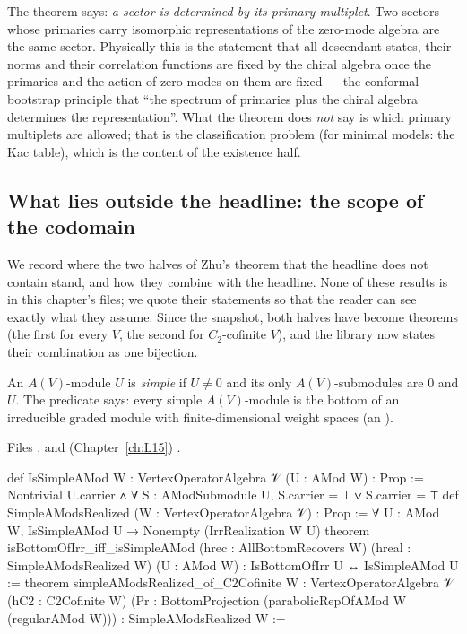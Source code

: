 \begin{physics}
The theorem says: \emph{a sector is determined by its primary multiplet}. Two sectors whose primaries carry isomorphic
representations of the zero-mode algebra are the same sector. Physically this is the statement that all descendant
states, their norms and their correlation functions are fixed by the chiral algebra once the primaries and the
action of zero modes on them are fixed --- the conformal bootstrap principle that ``the spectrum of primaries plus the
chiral algebra determines the representation''. What the theorem does \emph{not} say is which primary multiplets are
allowed; that is the classification problem (for minimal models: the Kac table), which is the content of the existence
half.
\end{physics}

\subsection{What lies outside the headline: the scope of the codomain}\label{l13:sec:scope}

We record where the two halves of Zhu's theorem that the headline does not contain stand, and how they combine with
the headline. None of these results is in this chapter's files; we quote their statements so that the reader can see
exactly what they assume. Since the snapshot, both halves have become theorems (the first for every $V$, the second for
$C_2$-cofinite $V$), and the library now states their combination as one bijection.

\begin{definition}\label{l13:def:simpleamod}
An $A(V)$-module $U$ is \emph{simple} if $U\neq0$ and its only $A(V)$-submodules are $0$ and $U$. The predicate
 says: every simple $A(V)$-module is the bottom of an irreducible graded module with
finite-dimensional weight spaces (an ).
\end{definition}
\noindent Files ,
 and (Chapter~\ref{ch:L15})
.
\begin{leancode}
def IsSimpleAMod {W : VertexOperatorAlgebra 𝒱} (U : AMod W) : Prop :=
  Nontrivial U.carrier ∧ ∀ S : AModSubmodule U, S.carrier = ⊥ ∨ S.carrier = ⊤
def SimpleAModsRealized (W : VertexOperatorAlgebra 𝒱) : Prop :=
  ∀ U : AMod W, IsSimpleAMod U → Nonempty (IrrRealization W U)
theorem isBottomOfIrr_iff_isSimpleAMod (hrec : AllBottomRecovers W)
    (hreal : SimpleAModsRealized W) (U : AMod W) :
    IsBottomOfIrr U ↔ IsSimpleAMod U :=
theorem simpleAModsRealized_of_C2Cofinite {W : VertexOperatorAlgebra 𝒱}
    (hC2 : C2Cofinite W)
    (Pr : BottomProjection (parabolicRepOfAMod W (regularAMod W))) :
    SimpleAModsRealized W :=
\end{leancode}

